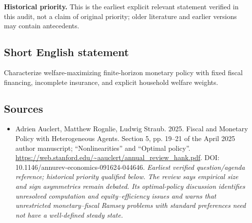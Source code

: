 \documentclass[11pt]{article}
\begin{document}
\par\textbf{Historical priority.} This is the earliest explicit relevant statement verified in this audit, not a claim of original priority; older literature and earlier versions may contain antecedents.

\subsection{Short English statement}
Characterize welfare-maximizing finite-horizon monetary policy with fixed fiscal financing, incomplete insurance, and explicit household welfare weights.

\subsection{Sources}
\begin{itemize}\raggedright
\item[\textnormal{[S1]}]\hypertarget{source:30007530:1}{} Adrien Auclert, Matthew Rognlie, Ludwig Straub. 2025. Fiscal and Monetary Policy with Heterogeneous Agents. Section 5, pp. 19–21 of the April 2025 author manuscript; “Nonlinearities” and “Optimal policy”.
\url{https://web.stanford.edu/~aauclert/annual_review_hank.pdf}.
DOI: 10.1146/annurev-economics-091624-044646.
{\small\textit{Earliest verified question/agenda reference; historical priority qualified below. The review says empirical size and sign asymmetries remain debated. Its optimal-policy discussion identifies unresolved computation and equity–efficiency issues and warns that unrestricted monetary–fiscal Ramsey problems with standard preferences need not have a well-defined steady state.}}
\end{itemize}
\end{document}
